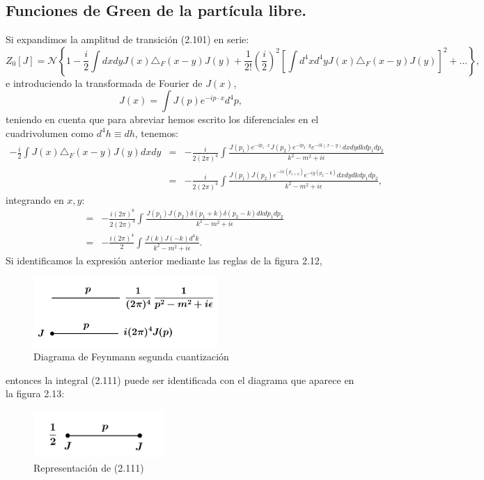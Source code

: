 \subsection{Funciones de Green de la partícula libre.}
Si expandimos la amplitud de transición (2.101) en serie:
\begin{equation}
Z_{0}[J]=\mathcal{N}\left\{ 1-\frac{i}{2}\int dxdyJ(x)\triangle_{F}(x-y)J(y)+\frac{1}{2!}\left(\frac{i}{2}\right)^{2}\left[\int d^{4}xd^{4}yJ(x)\triangle_{F}(x-y)J(y)\right]^{2}+...\right\},
\end{equation}
e introduciendo la transformada de Fourier de $J(x)$, 
\begin{equation}
J(x)=\int J(p)e^{-ip\cdot x}d^4p,
\end{equation}
teniendo en cuenta que para abreviar hemos escrito los diferenciales en el cuadrivolumen como $d^4h\equiv dh$, tenemos:
\begin{eqnarray}
\nonumber -\frac{i}{2}\int J(x)\triangle_F(x-y)J(y)dxdy&=&-\frac{i}{2(2\pi)^{4}}\int\frac{J(p_{1})e^{-ip_{1}\cdot x}J(p_{2})e^{-ip_{2}\cdot y}e^{-ik(x-y)}dxdydkdp_{1}dp_{2}}{k^{2}-m^{2}+i\epsilon}\\
\nonumber &=& -\frac{i}{2(2\pi)^{4}}\int\frac{J(p_{1})J(p_{2})e^{-ix(p_{1+k})}e^{-iy(p_{2}-k)}dxdydkdp_{1}dp_{2}}{k^{2}-m^{2}+i\epsilon},
\end{eqnarray}
integrando en $x,y$:
\begin{eqnarray}
\nonumber &=& -\frac{i(2\pi)^{8}}{2(2\pi)^{4}}\int\frac{J(p_{1})J(p_{2})\delta(p_{1}+k)\delta(p_{2}-k)dkdp_{1}dp_{2}}{k^{2}-m^{2}+i\epsilon}\\
&=& -\frac{i(2\pi)^{4}}{2}\int\frac{J(k)J(-k)d^{4}k}{k^{2}-m^{2}+i\epsilon}.
\end{eqnarray}
Si identificamos la expresión anterior mediante las reglas de la figura 2.12,
\begin{figure}
\caption[Diagrama de Feynmann segunda cuantización]{Diagrama de Feynmann segunda cuantización}
\includegraphics[width=7cm]{Imagenes/Fig12}
\end{figure}
entonces la integral (2.111) puede ser identificada con el diagrama que aparece en la figura 2.13:
\begin{figure}
\caption[Diagrama de Feynmann segunda cuantización]{Representación de (2.111)}
\includegraphics[width=5cm]{Imagenes/Fig13}
\end{figure}
